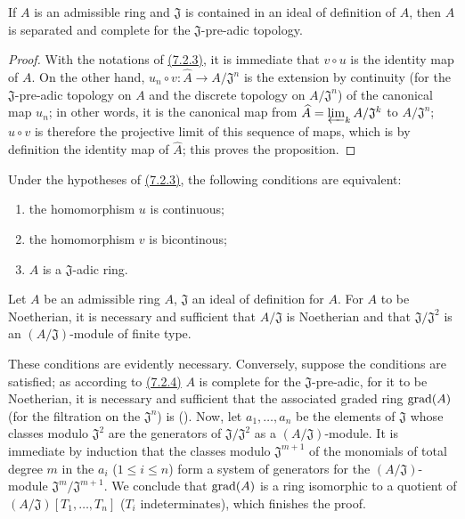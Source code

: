 \begin{prop}[7.2.4]
\label{0.7.2.4}
If $A$ is an admissible ring and $\mathfrak{J}$ is contained in an ideal of
definition of $A$, then $A$ is separated and complete for the
$\mathfrak{J}$-pre-adic topology.
\end{prop}

\begin{proof}
\label{proof-0.7.2.4}
With the notations of \hyperref[0.7.2.3]{(7.2.3)}, it is immediate that
$v\circ u$ is the identity map of $A$. On the other hand,
$u_n\circ v:\widehat{A}\to A/\mathfrak{J}^n$ is the extension by continuity (for
the $\mathfrak{J}$-pre-adic topology on $A$ and the discrete topology on
$A/\mathfrak{J}^n$) of the canonical map $u_n$; in other words, it is the
canonical map from $\widehat{A}=\varprojlim_k A/\mathfrak{J}^k$ to
$A/\mathfrak{J}^n$; $u\circ v$ is therefore the projective limit of this
sequence of maps, which is by definition the identity map of
$\widehat{A}$; this proves the proposition.
\end{proof}

\begin{cor}[7.2.5]
\label{0.7.2.5}
Under the hypotheses of \hyperref[0.7.2.3]{(7.2.3)}, the following conditions are
equivalent:
\begin{enumerate}[label={\rm(\alph*)}]
  \item the homomorphism $u$ is continuous;
  \item the homomorphism $v$ is bicontinous;
  \item $A$ is a $\mathfrak{J}$-adic ring.
\end{enumerate}
\end{cor}

\begin{cor}[7.2.6]
\label{0.7.2.6}
Let $A$ be an admissible ring $A$, $\mathfrak{J}$ an ideal of definition for
$A$. For $A$ to be Noetherian, it is necessary and sufficient that
$A/\mathfrak{J}$ is Noetherian and that $\mathfrak{J}/\mathfrak{J}^2$ is an
$(A/\mathfrak{J})$-module of finite type.
\end{cor}

These conditions are evidently necessary. Conversely, suppose the conditions
are satisfied; as according to \hyperref[0.7.2.4]{(7.2.4)} $A$ is complete for the
$\mathfrak{J}$-pre-adic, for it to be Noetherian, it is necessary and sufficient
that the associated graded ring ${\mathop{\mathrm{grad}}\nolimits}(A)$ (for the filtration on the
$\mathfrak{J}^n$) is (\cite[p~.18--07, th.~4]{I-1}). Now, let $a_1,\dots,a_n$ be
the elements of $\mathfrak{J}$ whose classes modulo $\mathfrak{J}^2$ are the
generators of $\mathfrak{J}/\mathfrak{J}^2$ as a $(A/\mathfrak{J})$-module. It
is immediate by induction that the classes modulo $\mathfrak{J}^{m+1}$ of the
monomials of total degree $m$ in the $a_i$ ($1\leqslant i\leqslant n$) form a
system of generators for the $(A/\mathfrak{J})$-module
$\mathfrak{J}^m/\mathfrak{J}^{m+1}$. We conclude that ${\mathop{\mathrm{grad}}\nolimits}(A)$ is a ring
isomorphic to a quotient of $(A/\mathfrak{J})[T_1,\dots,T_n]$ ($T_i$
indeterminates), which finishes the proof.

